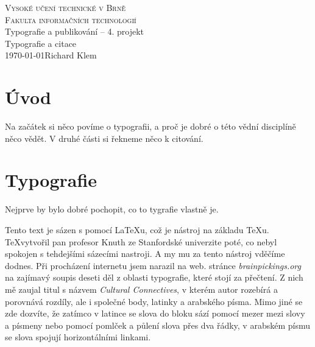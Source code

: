 \documentclass[a4paper, 11pt]{article}
\begin{document}
\begin{titlepage}
\begin{center}
\textsc{\Huge{Vysoké učení technické v Brně\\[0,3em]}
{\huge{Fakulta informačních technologií}}}\\
{\LARGE Typografie a publikování -- 4. projekt}\\[0,3em]
{\Huge{Typografie a citace}}\\
{\Large \today \hfill Richard Klem}
\end{center}
\end{titlepage}


\section{Úvod}
\justifying
Na začátek si něco povíme o typografii, a proč je dobré o této vědní disciplíně něco vědět. V druhé části si řekneme něco k citování.
\section{Typografie}
Nejprve by bylo dobré pochopit, co to tygrafie vlastně je.

\begin{quote}
 \emph{}\cite{Typografie}
\end{quote}
Tento text je sázen s pomocí \LaTeX u, což je nástroj na základu \TeX u. \TeX vytvořil pan profesor Knuth ze Stanfordské univerzite poté, co nebyl spokojen s tehdejšími sázecími nastroji.\cite{Olsak1999}
A my mu za tento nástroj vděčíme dodnes.
Při procházení internetu jsem narazil na web. stránce \emph{brainpickings.org}\cite{brainpicking} na zajímavý soupis deseti děl z oblasti typografie, které stojí za přečtení. Z nich mě zaujal titul s názvem \emph{Cultural Connectives}, v kterém autor rozebírá a porovnává rozdíly, ale i společné body, latinky a arabského písma. Mimo jiné se zde dozvíte, že zatímco v latince se slova do bloku sází pomocí mezer mezi slovy a písmeny nebo pomocí pomlček a půlení slova přes dva řádky, v arabském písmu se slova spojují horizontálními linkami.\cite{CulturalConnectives}
\end{document}
